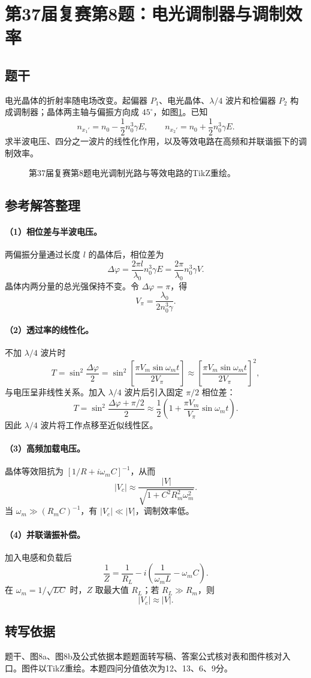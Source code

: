 \section{第37届复赛第8题：电光调制器与调制效率}
\subsection{题干}
电光晶体的折射率随电场改变。起偏器 $P_1$、电光晶体、$\lambda/4$ 波片和检偏器 $P_2$ 构成调制器；晶体两主轴与偏振方向成 $45^\circ$，如图\ref{fig:cpho37q08}。已知
\[
n_{x_1'}=n_0-\frac12n_0^3\gamma E,\qquad n_{x_2'}=n_0+\frac12n_0^3\gamma E.
\]
求半波电压、四分之一波片的线性化作用，以及等效电路在高频和并联谐振下的调制效率。
\begin{figure}[htbp]\centering
\caption{第37届复赛第8题电光调制光路与等效电路的TikZ重绘。}\label{fig:cpho37q08}\end{figure}
\subsection{参考解答整理}
\paragraph{（1）相位差与半波电压。} 两偏振分量通过长度 $l$ 的晶体后，相位差为
\[
\Delta\varphi=\frac{2\pi l}{\lambda_0}n_0^3\gamma E
=\frac{2\pi}{\lambda_0}n_0^3\gamma V.
\]
晶体内两分量的总光强保持不变。令 $\Delta\varphi=\pi$，得
\[
\boxed{V_\pi=\frac{\lambda_0}{2n_0^3\gamma}.}
\]
\paragraph{（2）透过率的线性化。} 不加 $\lambda/4$ 波片时
\[
T=\sin^2\frac{\Delta\varphi}{2}
=\sin^2\left[\frac{\pi V_m\sin\omega_mt}{2V_\pi}\right]
\approx\left[\frac{\pi V_m\sin\omega_mt}{2V_\pi}\right]^2,
\]
与电压呈非线性关系。加入 $\lambda/4$ 波片后引入固定 $\pi/2$ 相位差：
\[
\boxed{T=\sin^2\frac{\Delta\varphi+\pi/2}{2}
\approx\frac12\left(1+\frac{\pi V_m}{V_\pi}\sin\omega_mt\right).}
\]
因此 $\lambda/4$ 波片将工作点移至近似线性区。
\paragraph{（3）高频加载电压。} 晶体等效阻抗为 $[1/R+i\omega_mC]^{-1}$，从而
\[
|V_c|\approx\frac{|V|}{\sqrt{1+C^2R_m^2\omega_m^2}}.
\]
当 $\omega_m\gg(R_mC)^{-1}$，有 $|V_c|\ll|V|$，调制效率低。
\paragraph{（4）并联谐振补偿。} 加入电感和负载后
\[
\frac1Z=\frac1{R_L}-i\left(\frac1{\omega_mL}-\omega_mC\right).
\]
在 $\omega_m=1/\sqrt{LC}$ 时，$Z$ 取最大值 $R_L$；若 $R_L\gg R_m$，则
\[
\boxed{|V_c|\approx|V|.}
\]
\subsection{转写依据}
题干、图8a、图8b及公式依据本题题面转写稿、答案公式核对表和图件核对入口。图件以TikZ重绘。本题四问分值依次为12、13、6、9分。
